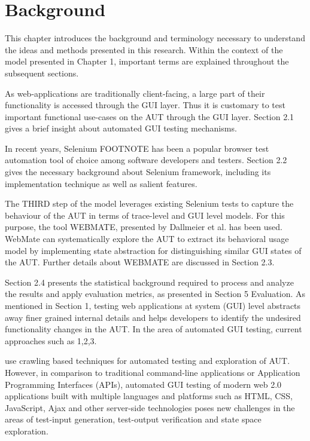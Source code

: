 \chapter{Background}
\label{Chapter2}

This chapter introduces the background and terminology necessary to understand the ideas and methods presented in this research. Within the context of the model presented in Chapter 1, important terms are explained throughout the subsequent sections.

As web-applications are traditionally client-facing, a large part of their functionality is accessed through the GUI layer. Thus it is customary to test important functional use-cases on the AUT through the GUI layer. Section 2.1 gives a brief insight about automated GUI testing mechanisms.

In recent years, Selenium FOOTNOTE has been a popular browser test automation tool of choice among software developers and testers. Section 2.2 gives the necessary background about Selenium framework, including its implementation technique as well as salient features.

The THIRD step of the model leverages existing Selenium tests to capture the behaviour of the AUT in terms of trace-level and GUI level models. For this purpose, the tool WEBMATE, presented by Dallmeier et al. has been used. WebMate can systematically explore the AUT to extract its behavioral usage model by implementing state abstraction for distinguishing similar GUI states of the AUT. Further details about WEBMATE are discussed in Section 2.3.

Section 2.4 presents the statistical background required to process and analyze the results and apply evaluation metrics, as presented in Section 5 Evaluation.
As mentioned in Section 1, testing web applications at system (GUI) level abstracts away finer grained internal details and helps developers to identify the undesired functionality changes in the AUT.  In the area of automated GUI testing, current approaches such as  1,2,3.

use crawling based techniques for automated testing and exploration of AUT. However, in comparison to traditional command-line applications or Application Programming Interfaces (APIs), automated GUI testing of modern web 2.0 applications built with multiple languages and platforms such as HTML, CSS, JavaScript, Ajax and other server-side technologies poses new challenges in the areas of test-input generation, test-output verification and state space exploration.

